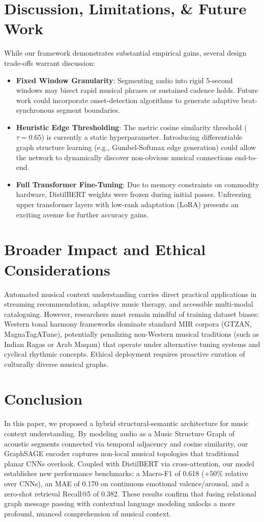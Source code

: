 \documentclass{article}
\begin{document}
\section{Discussion, Limitations, \& Future Work}
\label{sec:discussion}
While our framework demonstrates substantial empirical gains, several design trade-offs warrant discussion:
\begin{itemize}
    \item \textbf{Fixed Window Granularity}: Segmenting audio into rigid 5-second windows may bisect rapid musical phrases or sustained cadence holds. Future work could incorporate onset-detection algorithms to generate adaptive beat-synchronous segment boundaries.
    \item \textbf{Heuristic Edge Thresholding}: The metric cosine similarity threshold ($\tau=0.65$) is currently a static hyperparameter. Introducing differentiable graph structure learning (e.g., Gumbel-Softmax edge generation) could allow the network to dynamically discover non-obvious musical connections end-to-end.
    \item \textbf{Full Transformer Fine-Tuning}: Due to memory constraints on commodity hardware, DistilBERT weights were frozen during initial passes. Unfreezing upper transformer layers with low-rank adaptation (LoRA) presents an exciting avenue for further accuracy gains.
\end{itemize}

\section{Broader Impact and Ethical Considerations}
\label{sec:ethics}
Automated musical context understanding carries direct practical applications in streaming recommendation, adaptive music therapy, and accessible multi-modal cataloguing. However, researchers must remain mindful of training dataset biases: Western tonal harmony frameworks dominate standard MIR corpora (GTZAN, MagnaTagATune), potentially penalizing non-Western musical traditions (such as Indian Ragas or Arab Maqam) that operate under alternative tuning systems and cyclical rhythmic concepts. Ethical deployment requires proactive curation of culturally diverse musical graphs.

\section{Conclusion}
\label{sec:conclusion}
In this paper, we proposed a hybrid structural-semantic architecture for music context understanding. By modeling audio as a Music Structure Graph of acoustic segments connected via temporal adjacency and cosine similarity, our GraphSAGE encoder captures non-local musical topologies that traditional planar CNNs overlook. Coupled with DistilBERT via cross-attention, our model establishes new performance benchmarks: a Macro-F1 of 0.618 ($+50\%$ relative over CNNs), an MAE of 0.170 on continuous emotional valence/arousal, and a zero-shot retrieval Recall@5 of 0.382. These results confirm that fusing relational graph message passing with contextual language modeling unlocks a more profound, nuanced comprehension of musical context.
\end{document}
